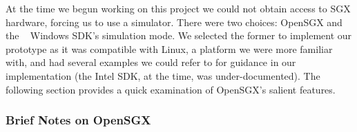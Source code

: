 \documentclass[../main.tex]{subfiles}
\begin{document}
At the time we begun working on this project we could not obtain
access to SGX hardware, forcing us to use a simulator. There were two
choices: OpenSGX and the \Intel~ Windows SDK's simulation
mode. We selected the former to implement our prototype as it was
compatible with Linux, a platform we were more familiar with, and had
several examples we could refer to for guidance in our implementation
(the Intel SDK, at the time, was under-documented). The following
section provides a quick examination of OpenSGX's salient features.


\subsubsection{Brief Notes on OpenSGX}

\end{document}
